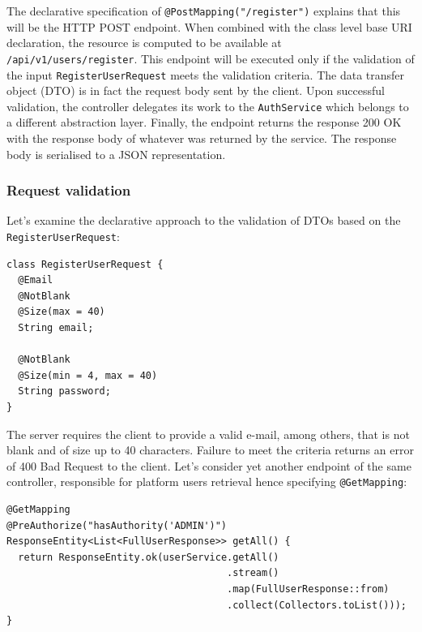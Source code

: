 \documentclass[a4paper,twoside,12pt]{book}
\begin{document}
The declarative specification of \texttt{@PostMapping("/register")} explains that this will be the HTTP POST endpoint. When combined with the class level base URI declaration, the resource is computed to be available at %
\verb|/api/v1/users/register|.
%
This endpoint will be executed only if the validation of the input %
\texttt{RegisterUserRequest} meets the validation criteria. The data transfer object (DTO) is in fact the request body sent by the client.
%
Upon successful validation, the controller delegates its work to the \texttt{AuthService} which belongs to a different abstraction layer.
%
Finally, the endpoint returns the response 200 OK \cite{bib:rfc7231} with the response body of whatever was returned by the service. The response body is serialised to a JSON representation.

\subsubsection{Request validation}
Let's examine the declarative approach to the validation of DTOs based on the \texttt{RegisterUserRequest}:

\begin{verbatim}
class RegisterUserRequest {
  @Email
  @NotBlank
  @Size(max = 40)
  String email;

  @NotBlank
  @Size(min = 4, max = 40)
  String password;
}
\end{verbatim}

The server requires the client to provide a valid e-mail, among others, that is not blank and of size up to 40 characters. Failure to meet the criteria returns an error of 400 Bad Request to the client.
%
Let's consider yet another endpoint of the same controller, responsible for platform users retrieval hence specifying \verb|@GetMapping|:

\begin{verbatim}
@GetMapping
@PreAuthorize("hasAuthority('ADMIN')")
ResponseEntity<List<FullUserResponse>> getAll() {
  return ResponseEntity.ok(userService.getAll()
                                      .stream()
                                      .map(FullUserResponse::from)
                                      .collect(Collectors.toList()));
}
\end{verbatim}
\end{document}
